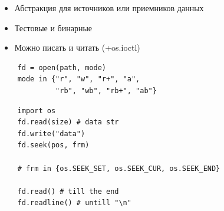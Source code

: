 \documentclass{article}
\begin{document}
\begin{itemize}
	\item Абстракция для источников или приемников данных
	\item Тестовые и бинарные
	\item Можно писать и читать (+os.ioctl)
\end{itemize}
\vspace{15pt}
\begin{lstlisting}
    fd = open(path, mode)
    mode in {"r", "w", "r+", "a", 
             "rb", "wb", "rb+", "ab"}
\end{lstlisting}
\newpage

\vspace{15pt}
\begin{lstlisting}
	import os
	fd.read(size) # data str
	fd.write("data")
	fd.seek(pos, frm)
	
	# frm in {os.SEEK_SET, os.SEEK_CUR, os.SEEK_END}
	
	fd.read() # till the end
	fd.readline() # untill "\n"
\end{lstlisting}
\newpage
\end{document}
